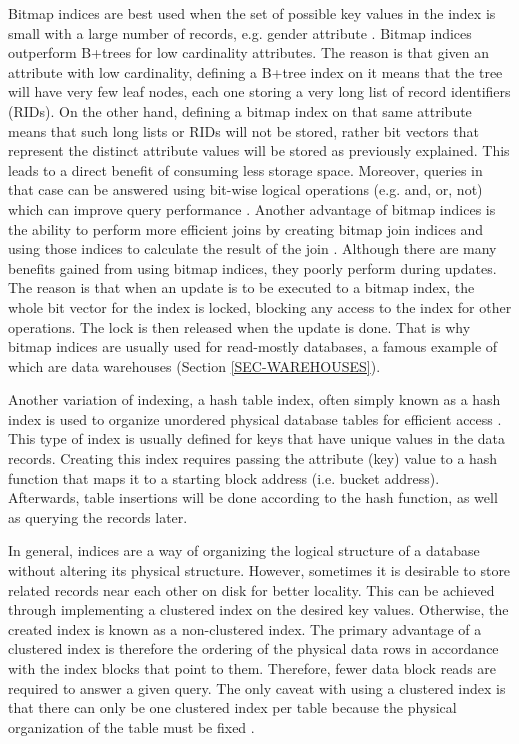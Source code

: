 \documentclass[12pt,a4paper]{article}
\begin{document}
Bitmap indices are best used when the set of possible key values in the index is small with a large number of records, e.g. gender attribute
\cite{oneil1995multi}. Bitmap indices outperform B+trees for low cardinality attributes. The reason is that given an attribute with low cardinality, defining a
B+tree index
on it means that the tree will have very few leaf nodes, each one storing a very long list of record identifiers (RIDs). On the other hand, defining a
bitmap index on that same attribute means that such long lists or RIDs will not be stored, rather bit vectors that represent the distinct attribute values will
be stored as previously explained. This leads to a direct benefit of consuming less storage space. Moreover, queries in that case can be answered using bit-wise
logical operations (e.g. and, or, not) which can improve query performance \cite{oneil1997improved}. Another advantage of bitmap indices is the ability to
perform more
efficient joins by creating bitmap join indices and using those indices to calculate the result of the join \cite{oneil1995multi}. Although there are many
benefits
gained from using bitmap indices, they poorly perform during updates. The reason is that when an update is to be executed to a bitmap index, the whole bit
vector
for the index is locked, blocking any access to the index for other operations. The lock is then released when the update is done. That is why bitmap indices
are usually used for read-mostly databases, a famous example of which are data warehouses (Section \ref{SEC-WAREHOUSES}).

Another variation of indexing, a hash table index, often simply known as a hash index is used to organize unordered physical database tables for efficient
access \cite{lightstone2007physical}. This type of index is usually defined for keys that have unique values in the data records. Creating this index requires
passing the attribute (key) value to a hash function that maps it to a starting block address (i.e. bucket address). Afterwards, table insertions will be done
according to the hash function, as well as querying the records later.

In general, indices are a way of organizing the logical structure of a database without altering its physical structure. However, sometimes it is desirable to
store related records near each other on disk for better locality. This can be achieved through implementing a clustered index on the desired key values.
Otherwise, the created index is known as a non-clustered index. The primary advantage of a clustered index is therefore the ordering of the physical data rows
in accordance with the index blocks that point to them. Therefore, fewer data block reads are required to answer a given query. The only caveat with using a
clustered index is that there can only be one clustered index per table because the physical organization of the table must be fixed
\cite{lightstone2007physical}.
\end{document}
